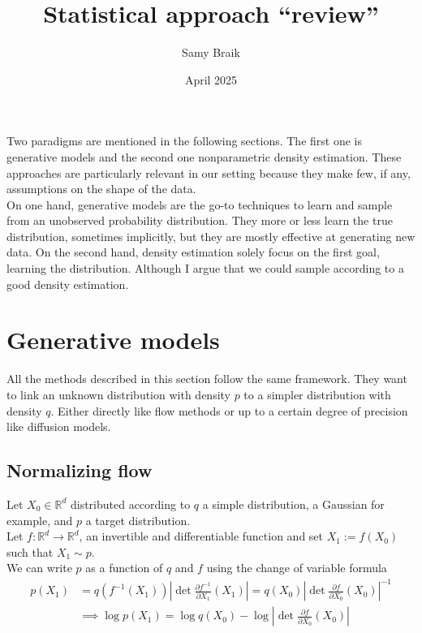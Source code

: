 \documentclass{article}
\title{Statistical approach ``review''}
\author{Samy Braik}
\date{April 2025}
\begin{document}
\maketitle

Two paradigms are mentioned in the following sections. The first one is generative models and the second one nonparametric density estimation. These approaches are particularly relevant in our setting because they make few, if any, assumptions on the shape of the data. \\
On one hand, generative models are the go-to techniques to learn and sample from an unobserved probability distribution. They more or less learn the true distribution, sometimes implicitly, but they are mostly effective at generating new data. On the second hand, density estimation solely focus on the first goal, learning the distribution. Although I argue that we could sample according to a good density estimation.

\section{Generative models}
All the methods described in this section follow the same framework. They want to link an unknown distribution with density \(p\) to a simpler distribution with density \(q\). Either directly like flow methods or up to a certain degree of precision like diffusion models.
\subsection{Normalizing flow}
Let \(X_0\in\mathbb{R}^d\) distributed according to \(q\) a simple distribution, a Gaussian for example, and \(p\) a target distribution.
\\
Let \(f:\mathbb{R}^d\rightarrow\mathbb{R}^d\), an invertible and differentiable function and set \(X_1:=f(X_0)\) such that \(X_1\sim p\). \\
We can write \(p\) as a function of \(q\) and \(f\) using the change of variable formula 
\begin{align}
    p(X_1)&=q(f^{-1}(X_1))\left| \det\frac{\partial f^{-1}}{\partial X_1}(X_1) \right| = q(X_0)\left| \det \frac{\partial f}{\partial X_0}(X_0) \right|^{-1} \\
    &\implies \log p(X_1)=\log q(X_0) - \log \left|  \det \frac{\partial f}{\partial X_0}(X_0) \right|  
\end{align}
\end{document}
